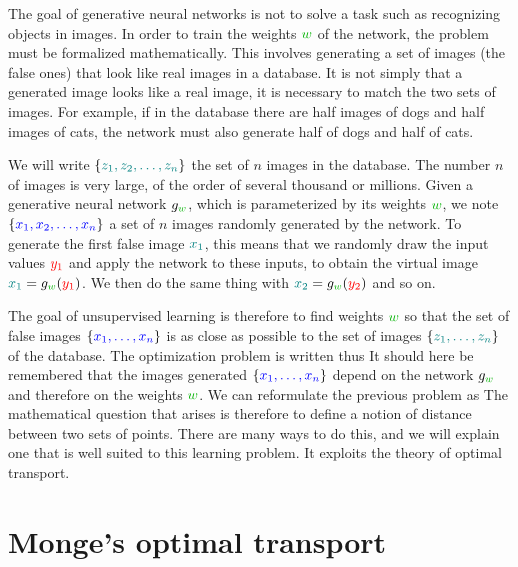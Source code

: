 The goal of generative neural networks is not to solve a task such as recognizing objects in images.
%
In order to train the weights $\mygreen{w}$ of the network, the problem must be formalized mathematically. This involves generating a set of  images (the false ones) that look like real images in a database. It is not simply that a generated image looks like a real image, it is necessary to match the two sets of images. For example, if in the database there are half images of dogs and half images of cats, the network must also generate half of dogs and half of cats.

We will write $\{\mylblue{z_1, z_2, \ldots, z_n}\}$ the set of $n$ images in the database. The number $n$ of images is very large, of the order of several thousand or millions. Given a generative neural network $g_{\mygreen{w}}$, which is parameterized by its weights $\mygreen{w}$, we note $\{\myblue{x_1, x_2, \ldots, x_n} \}$ a set of $n$  images randomly generated by the network. To generate the first false image $\mylblue{x_1}$, this means that we randomly draw the input values ${\color{red} y_1}$ and apply the network to these inputs, to obtain the virtual image $\mylblue{x_1} = g_{\mygreen{w}}({\color{red} y_1})$. We then do the same thing with $\mylblue{x_2} = g_{\mygreen{w}} ({\color{red} y_2})$ and so on.

The goal of unsupervised learning is therefore to find weights $\mygreen{w}$ so that the set of false images $\{\myblue{x_1, \ldots, x_n} \}$ is as close as possible to the set of images $\{\mylblue{z_1, \ldots, z_n}\}$ of the database. The optimization problem is written thus
It should here be remembered that the images generated $\{\myblue{x_1, \ldots, x_n} \}$ depend on the network $g_{\mygreen{w}}$ and therefore on the weights $\mygreen{w}$. We can reformulate the previous problem as
%
The mathematical question that arises is therefore to define a notion of distance between two sets of points. There are many ways to do this, and we will explain one that is well suited to this learning problem.
%
It exploits the theory of optimal transport.


\section{Monge's optimal transport}
\label{sec-ot}

